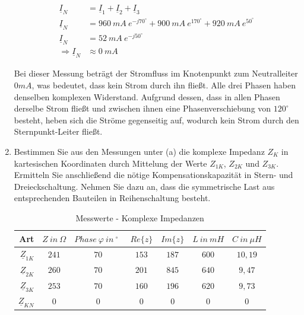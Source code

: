 \begin{enumerate}[label=\alph*)]
	 		\begin{align*}
	 			\underline{I}_{N} &= \underline{I}_{1}+\underline{I}_{2}+\underline{I}_{3} \\
	 			\underline{I}_{N} &= 960\ mA\ e^{-j70^\circ} + 900\ mA\ e^{170^\circ} + 920\ mA\ e^{50^\circ} \\
	 			\underline{I}_{N} &= 52\ mA\ e^{-j50^\circ} \\
 				\Longrightarrow\underline{I}_{N} &\approx 0\ mA
	 		\end{align*}
	 		
	 		Bei dieser Messung beträgt der Stromfluss im Knotenpunkt zum Neutralleiter $0 mA$, was bedeutet, dass kein Strom durch ihn fließt. Alle drei Phasen haben denselben komplexen Widerstand. Aufgrund dessen, dass in allen Phasen derselbe Strom fließt und zwischen ihnen eine Phasenverschiebung von $120^\circ$ besteht, heben sich die Ströme gegenseitig auf, wodurch kein Strom durch den Sternpunkt-Leiter fließt.
	 		
	 		\item Bestimmen Sie aus den Messungen unter (a) die komplexe Impedanz $Z_{K}$ in kartesischen Koordinaten durch Mittelung der Werte $Z_{1K}$, $Z_{2K}$ und $Z_{3K}$. Ermitteln Sie anschließend die nötige Kompensationskapazität in Stern- und Dreieckschaltung. Nehmen Sie dazu an, dass die symmetrische Last aus entsprechenden Bauteilen in Reihenschaltung besteht.
	 		
	 		\begin{center}
	 			\begin{table}[h]
	 				\begin{tabular}{r c c c c c c}
	 					\hline
	 					Art & \( Z\ in\ \Omega\) & \( Phase\ \varphi\ in\ ^\circ\ \ \)  & \( Re{\{z\}} \) & \( Im{\{z\}} \) & \( L\ in\ mH \) & \( C\ in\ \mu H \) \\
	 					\hline
	 					$\underline{Z}_{1K}$ & \( 241 \) & \( 70 \)		& \( 153 \) & \( 187 \) & \( 600 \)	& \( 10,19 \)\\
	 					$\underline{Z}_{2K}$ & \( 260 \) & \( 70 \)		& \( 201 \) & \( 845 \) & \( 640 \)	& \( 9,47 \)\\
	 					$\underline{Z}_{3K}$ & \( 253 \) & \( 70 \)		& \( 160 \) & \( 196 \) & \( 620 \)	& \( 9,73 \)\\
	 					$\underline{Z}_{KN}$ & \( 0   \) & \( 0 \)		& \( 0   \) & \( 0 \)	& \( 0 \)	& \( 0 \)\\
	 					\hline
	 				\end{tabular}
	 				\caption{Messwerte - Komplexe Impedanzen}
	 			\end{table}
	 		\end{center}
	 		

\end{enumerate}

